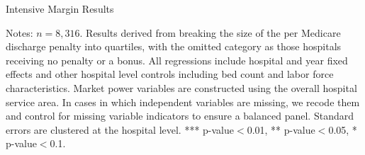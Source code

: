 \documentclass[12pt]{article}
\begin{document}
\newpage
{}
\setlength{\captionmargin}{.5 \textwidth} \addtolength{\captionmargin}{-.5\wd\gfxbox}
\begin{table}[htbp!]
\centering
\caption{Intensive Margin Results}
\label{tab:int}
\usebox{\gfxbox}
\par
\begin{minipage}{\wd\gfxbox}
\footnotesize
Notes: $n=8,316$.  Results derived from breaking the size of the per Medicare discharge penalty into quartiles, with the omitted category as those hospitals receiving no penalty or a bonus.  All regressions include hospital and year fixed effects and other hospital level controls including bed count and labor force characteristics.  Market power variables are constructed using the overall hospital service area.  In cases in which independent variables are missing, we recode them and control for missing variable indicators to ensure a balanced panel.  Standard errors are clustered at the hospital level.  *** p-value$<$0.01, ** p-value$<$0.05, * p-value$<$0.1.
\end{minipage}
\end{table}
\end{document}
